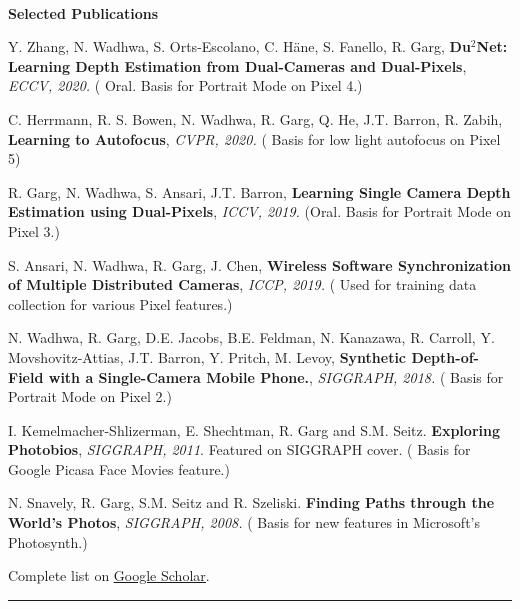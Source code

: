 \documentclass[10pt]{article}
\newenvironment{itemize*}%
  {\begin{itemize}%
    \setlength{\itemsep}{0pt}%
    \setlength{\parskip}{0pt}%
	}
  {\end{itemize}}
\begin{document}
\\
\vspace{0.10in}
{\large \textbf{Selected Publications}}
\begin{itemize*}
\item Y. Zhang, N. Wadhwa, S. Orts-Escolano, C. H\"ane, S. Fanello, R. Garg, \textbf{Du$^2$Net: Learning Depth Estimation from Dual-Cameras and Dual-Pixels}, \emph{ECCV, 2020.} ({\color{red} Oral. Basis for Portrait Mode on Pixel 4.})
\item C. Herrmann, R. S. Bowen, N. Wadhwa, R. Garg, Q. He, J.T. Barron, R. Zabih, \textbf{Learning to Autofocus}, \emph{CVPR, 2020.} ({\color{red} Basis for low light autofocus on Pixel 5})
\item R. Garg, N. Wadhwa, S. Ansari, J.T. Barron, \textbf{Learning Single Camera Depth Estimation using Dual-Pixels}, \emph{ICCV, 2019.} ({\color{red}Oral. Basis for Portrait Mode on Pixel 3.})
\item S. Ansari, N. Wadhwa, R. Garg, J. Chen, \textbf{Wireless Software Synchronization of Multiple Distributed Cameras}, \emph{ICCP, 2019.} ({\color{red} Used for training data collection for various Pixel features.})
\item N. Wadhwa, R. Garg, D.E. Jacobs, B.E. Feldman, N. Kanazawa, R. Carroll, Y. Movshovitz-Attias, J.T. Barron, Y. Pritch, M. Levoy, \textbf{Synthetic Depth-of-Field with a Single-Camera Mobile Phone.}, \emph{SIGGRAPH, 2018.} ({\color{red} Basis for Portrait Mode on Pixel 2.})
\item I. Kemelmacher-Shlizerman, E. Shechtman, R. Garg and S.M. Seitz. \textbf{Exploring Photobios}, \emph{SIGGRAPH, 2011}. Featured on SIGGRAPH cover. ({\color{red} Basis for Google Picasa Face Movies feature.})
\item N. Snavely, R. Garg, S.M. Seitz and R. Szeliski. \textbf{Finding Paths through the World's Photos}, \emph{SIGGRAPH, 2008.} ({\color{red} Basis for new features in Microsoft's Photosynth.})
\end{itemize*}
Complete list on \href{https://scholar.google.com/citations?user=0eQjcEEAAAAJ}{\underline{Google Scholar}}.
\rule{7.0in}{2pt}
\end{document}
